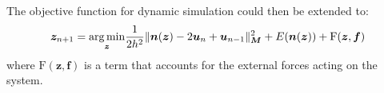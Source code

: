 The objective function for dynamic simulation could then be extended to:
\begin{equation}
    \bm{z}_{n+1} = \underset{\bm{z}}{\operatorname*{arg\,min}} \frac{1}{2h^2} \|\bm{n}(\bm{z}) - 2\bm{u}_n + \bm{u}_{n-1}\|_{\bm{M}}^2 + E(\bm{n}(\bm{z})) + \text{F}(\bm{z}, \bm{f})
\end{equation}
where $\text{F}(\bm{z}, \bm{f})$ is a term that accounts for the external forces acting on the system.

